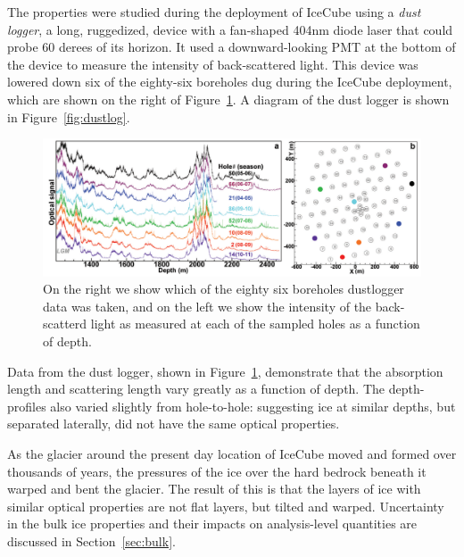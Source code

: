 \documentclass[main.tex]{subfiles}
\begin{document}
The properties were studied during the deployment of IceCube using a \textit{dust logger}, a long, ruggedized, device with a fan-shaped 404nm diode laser that could probe 60 derees of its horizon. 
It used a downward-looking PMT at the bottom of the device to measure the intensity of back-scattered light.
This device was lowered down six of the eighty-six boreholes dug during the IceCube deployment, which are shown on the right of Figure~\ref{fig:icetilt}.
A diagram of the dust logger is shown in Figure~\ref{fig:dustlog}.

\begin{figure}  
    \centering
    \includegraphics[width=0.8\linewidth]{figures/tilt.png}
    \caption{On the right we show which of the eighty six boreholes dustlogger data was taken, and on the left we show the intensity of the back-scatterd light as measured at each of the sampled holes as a function of depth.}\label{fig:icetilt}
\end{figure}

Data from the dust logger, shown in Figure~\ref{fig:icetilt}, demonstrate that the absorption length and scattering length vary greatly as a function of depth. 
The depth-profiles also varied slightly from hole-to-hole: suggesting ice at similar depths, but separated laterally, did not have the same optical properties.

As the glacier around the present day location of IceCube moved and formed over thousands of years, the pressures of the ice over the hard bedrock beneath it warped and bent the glacier. 
The result of this is that the layers of ice with similar optical properties are not flat layers, but tilted and warped. 
Uncertainty in the bulk ice properties and their impacts on analysis-level quantities are discussed in Section~\ref{sec:bulk}.
\end{document}
